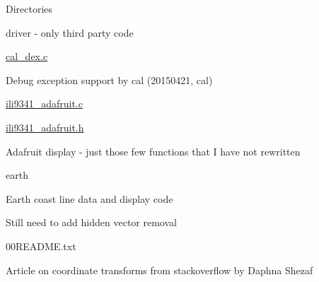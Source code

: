 \begin{DoxyParagraph}{Directories}
\begin{DoxyItemize}
\item driver -\/ only third party code
\begin{DoxyItemize}
\item \hyperlink{cal__dex_8c}{cal\+\_\+dex.\+c}
\begin{DoxyItemize}
\item Debug exception support by cal (20150421, cal)
\end{DoxyItemize}
\item \hyperlink{ili9341__adafruit_8c}{ili9341\+\_\+adafruit.\+c}
\item \hyperlink{ili9341__adafruit_8h}{ili9341\+\_\+adafruit.\+h}
\begin{DoxyItemize}
\item Adafruit display -\/ just those few functions that I have not rewritten
\end{DoxyItemize}
\end{DoxyItemize}
\item earth
\begin{DoxyItemize}
\item Earth coast line data and display code
\item Still need to add hidden vector removal
\begin{DoxyItemize}
\item 00\+R\+E\+A\+D\+M\+E.\+txt
\begin{DoxyItemize}
\item Article on coordinate transforms from stackoverflow by Daphna Shezaf
\end{DoxyItemize}
\end{DoxyItemize}
\end{DoxyItemize}
\end{DoxyItemize}
\end{DoxyParagraph}

